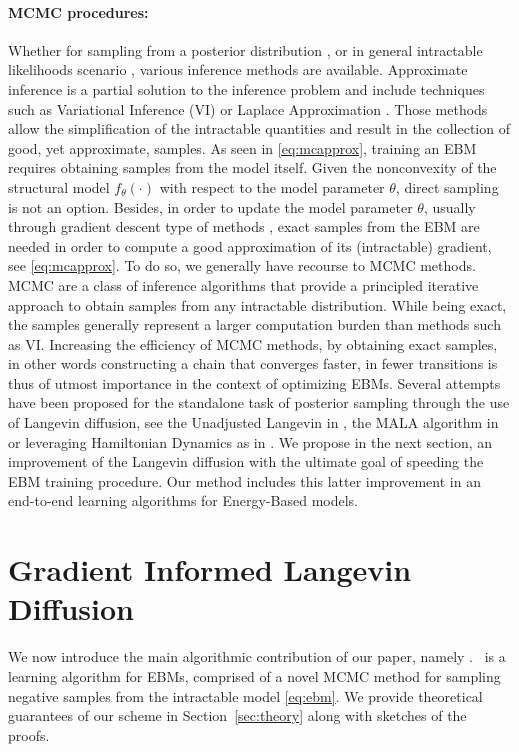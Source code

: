 \documentclass[10pt,twocolumn,letterpaper]{article}
\begin{document}
\paragraph{MCMC procedures: }
Whether for sampling from a posterior distribution \cite{mh:robert}, or in general intractable likelihoods scenario \cite{doucet2000sequential}, various inference methods are available.
Approximate inference is a partial solution to the inference problem and include techniques such as Variational Inference (VI) \cite{jordanvi,freitas} or Laplace Approximation \cite{wolfinger,rue2009approximate}. 
Those methods allow the simplification of the intractable quantities and result in the collection of good, yet approximate, samples.
As seen in \eqref{eq:mcapprox}, training an EBM requires obtaining samples from the model itself.
Given the nonconvexity of the structural model $f_\theta(\cdot)$ with respect to the model parameter $\theta$, direct sampling is not an option.
Besides, in order to update the model parameter $\theta$, usually through gradient descent type of methods \cite{bottou2008},  exact samples from the EBM are needed in order to compute a good approximation of its (intractable) gradient, see \eqref{eq:mcapprox}.
To do so, we generally have recourse to MCMC methods.
MCMC are a class of inference algorithms that provide a principled iterative approach to obtain samples from any intractable distribution.
While being exact, the samples generally represent a larger computation burden than methods such as VI.
Increasing the efficiency of MCMC methods, by obtaining exact samples, in other words constructing a chain that converges faster, in fewer transitions is thus of utmost importance in the context of optimizing EBMs.
Several attempts have been proposed for the standalone task of posterior sampling through the use of Langevin diffusion, see the Unadjusted Langevin in \cite{brosse2017tamed}, the MALA algorithm in \cite{roberts,robertsmala,durmus2017fast} or leveraging Hamiltonian Dynamics as in \cite{girolami}.
We propose in the next section, an improvement of the Langevin diffusion with the ultimate goal of speeding the EBM training procedure.
Our method includes this latter improvement in an end-to-end learning algorithms for Energy-Based models.

\section{Gradient Informed Langevin Diffusion}\label{sec:main}

We now introduce the main algorithmic contribution of our paper, namely \algo.
\algo\ is a learning algorithm for EBMs, comprised of a novel MCMC method for sampling negative samples from the intractable model \eqref{eq:ebm}.
We provide theoretical guarantees of our scheme in Section~\ref{sec:theory} along with sketches of the proofs.
\end{document}
